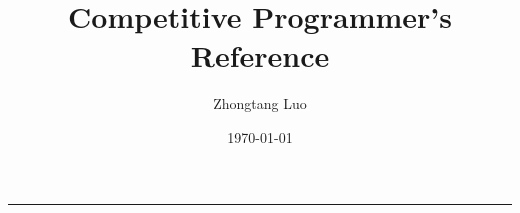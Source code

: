 \documentclass[10pt, oneside]{book}
\title{Competitive Programmer's Reference}
\author{Zhongtang Luo}
\date{\today}
\begin{document}
\makeatletter
\begin{titlepage}
    {
        \centering
        \vspace*{6cm}
        {\huge\bfseries \@title \par}
        \vspace{1.5cm}
        {\Large \@author \par}
        \vspace{1.5cm}
        {\Large \@date \par}
    }
    \vspace{1.5cm}
    \noindent\rule{\textwidth}{1pt} \par
    \vspace{1.5cm}
    
\end{titlepage}
\makeatother

\begingroup
\let\clearpage\relax
\let\cleardoublepage\relax

\begin{multicols}{2}
    \tableofcontents

    
    
    
\end{multicols}

\endgroup
\end{document}
